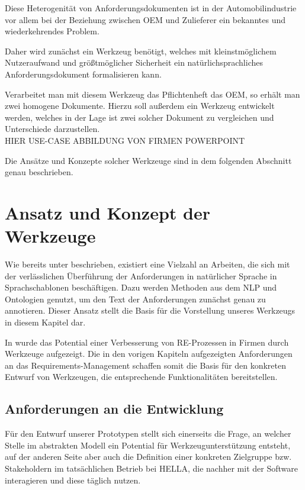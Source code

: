 \documentclass[12pt]{report}
\begin{document}
Diese Heterogenität von Anforderungsdokumenten ist in der Automobilindustrie vor allem bei der Beziehung zwischen OEM und Zulieferer ein bekanntes und wiederkehrendes Problem.

Daher wird zunächst ein Werkzeug benötigt, welches mit kleinstmöglichem Nutzeraufwand und größtmöglicher Sicherheit ein natürlichsprachliches Anforderungsdokument formalisieren kann. 

Verarbeitet man mit diesem Werkzeug das Pflichtenheft das OEM, so erhält man zwei homogene Dokumente. Hierzu soll außerdem ein Werkzeug entwickelt werden, welches in der Lage ist zwei solcher Dokument zu vergleichen und Unterschiede darzustellen.
\\ 
\newline
HIER USE-CASE ABBILDUNG VON FIRMEN POWERPOINT 
\\
\newline

Die Ansätze und Konzepte solcher Werkzeuge sind in dem folgenden Abschnitt genau beschrieben.

\section{Ansatz und Konzept der Werkzeuge}
Wie bereits unter beschrieben, existiert eine Vielzahl an Arbeiten, die sich mit der verlässlichen Überführung der Anforderungen in natürlicher Sprache in Sprachschablonen beschäftigen. Dazu werden Methoden aus dem NLP und Ontologien genutzt, um den Text der Anforderungen zunächst genau zu annotieren. Dieser Ansatz stellt die Basis für die Vorstellung unseres Werkzeugs in diesem Kapitel dar.

In \cite{zh17} wurde das Potential einer Verbesserung von RE-Prozessen in Firmen durch Werkzeuge aufgezeigt. Die in den vorigen Kapiteln aufgezeigten Anforderungen an das Requirements-Management schaffen somit die Basis für den konkreten Entwurf von Werkzeugen, die entsprechende Funktionalitäten bereitstellen.

\subsection{Anforderungen an die Entwicklung}
Für den Entwurf unserer Prototypen stellt sich einerseits die Frage, an welcher Stelle im abstrakten Modell ein Potential für Werkzeugunterstützung entsteht, auf der anderen Seite aber auch die Definition einer konkreten Zielgruppe bzw. Stakeholdern im tatsächlichen Betrieb bei HELLA, die nachher mit der Software interagieren und diese täglich nutzen.
\end{document}
